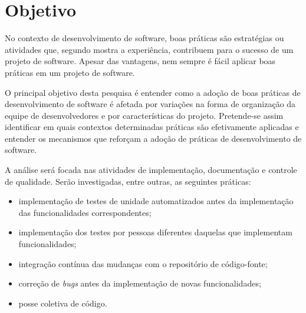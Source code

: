 \documentclass{article}
\begin{document}



\section{Objetivo}

No contexto de desenvolvimento de software, boas práticas são estratégias ou
atividades que, segundo mostra a experiência, contribuem para o sucesso de um
projeto de software. Apesar das vantagens, nem sempre é fácil aplicar boas
práticas em um projeto de software. %

O principal objetivo desta pesquisa é entender como a adoção de boas práticas de
desenvolvimento de software é afetada por variações na forma de organização da
equipe de desenvolvedores e por características do projeto. Pretende-se assim
identificar em quais contextos determinadas práticas são efetivamente aplicadas
e entender os mecanismos que reforçam a adoção de práticas de desenvolvimento de
software.

A análise será focada nas atividades de implementação, documentação e controle
de qualidade. Serão investigadas, entre outras, as seguintes práticas:

\begin{itemize}
  \item implementação de testes de unidade automatizados antes da implementação
  das funcionalidades correspondentes;
  \item implementação dos testes por pessoas diferentes daquelas que
  implementam funcionalidades;
  \item integração contínua das mudanças com o repositório de código-fonte;
  \item correção de \emph{bugs} antes da implementação de novas funcionalidades;
  \item posse coletiva de código.
\end{itemize}
\end{document}
